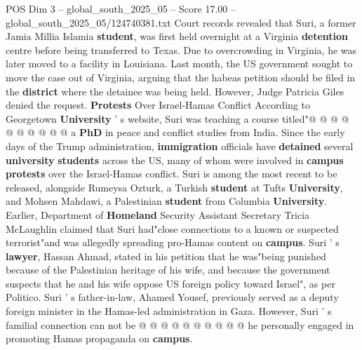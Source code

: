 \begin{textsample}{POS Dim 3 – global\_south\_2025\_05 – Score 17.00 – global\_south\_2025\_05/124740381.txt}
Court records revealed that Suri, a former Jamia Millia Islamia \textbf{student}, was first held overnight at a Virginia \textbf{detention} centre before being transferred to Texas.
Due to overcrowding in Virginia, he was later moved to a facility in Louisiana.
Last month, the US government sought to move the case out of Virginia, arguing that the habeas petition should be filed in the \textbf{district} where the detainee was being held.
However, Judge Patricia Giles denied the request. \textbf{Protests} Over Israel-Hamas Conflict According to Georgetown \textbf{University} ' s website, Suri was teaching a course titled"@ @ @ @ @ @ @ @ @ @ a \textbf{PhD} in peace and conflict studies from India.
Since the early days of the Trump administration, \textbf{immigration} officials have \textbf{detained} several \textbf{university} \textbf{students} across the US, many of whom were involved in \textbf{campus} \textbf{protests} over the Israel-Hamas conflict.
Suri is among the most recent to be released, alongside Rumeysa Ozturk, a Turkish \textbf{student} at Tufts \textbf{University}, and Mohsen Mahdawi, a Palestinian \textbf{student} from Columbia \textbf{University}.
Earlier, Department of \textbf{Homeland} Security Assistant Secretary Tricia McLaughlin claimed that Suri had"close connections to a known or suspected terrorist"and was allegedly spreading pro-Hamas content on \textbf{campus}.
Suri ' s \textbf{lawyer}, Hassan Ahmad, stated in his petition that he was"being punished because of the Palestinian heritage of his wife, and because the government suspects that he and his wife oppose US foreign policy toward Israel", as per Politico.
Suri ' s father-in-law, Ahamed Yousef, previously served as a deputy foreign minister in the Hamas-led administration in Gaza.
However, Suri ' s familial connection can not be @ @ @ @ @ @ @ @ @ @ he personally engaged in promoting Hamas propaganda on \textbf{campus}.

\end{textsample}
